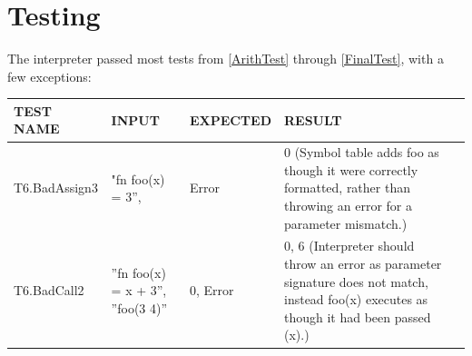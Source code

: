 \documentclass[a4paper, oneside, 11pt]{report}
\begin{document}





    \clearpage
    \section{Testing}
    The interpreter passed most tests from \ref{ArithTest} through \ref{FinalTest}, with a few exceptions:
    \begin{center}
        \begin{tabular}{|p{1.5in}|p{1.5in}|p{1in}|p{1.6in}|p{2.4in}|}
            \hline
            TEST NAME & INPUT & EXPECTED & RESULT \\
            \hline
            T6.BadAssign3 & "fn foo(x) = 3”, & Error & 0 (Symbol table adds foo as though it were correctly formatted, rather than throwing an error for a parameter mismatch.) \\
            \hline
            T6.BadCall2 & ”fn foo(x) = x + 3”, ”foo(3 4)” & 0, Error & 0, 6 (Interpreter should throw an error as parameter signature does not match, instead foo(x) executes as though it had been passed (x).) \\
            \hline

        \end{tabular}
    \end{center}
\end{document}
